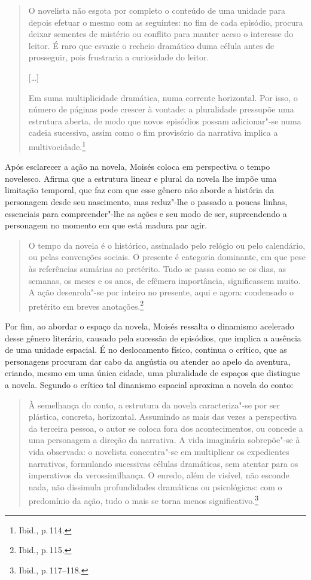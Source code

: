 \begin{quote}
O novelista não esgota por completo o conteúdo de uma unidade para depois efetuar o mesmo com as seguintes: no fim de cada episódio, procura deixar sementes de mistério ou conflito para manter aceso o interesse do leitor. É raro que esvazie o recheio dramático duma célula antes de prosseguir, pois frustraria a curiosidade do leitor.

{[}\ldots{]}

Em suma multiplicidade dramática, numa corrente horizontal. Por isso, o número de páginas pode crescer à vontade: a pluralidade pressupõe uma estrutura aberta, de modo que novos episódios possam adicionar"-se numa cadeia sucessiva, assim como o fim provisório da narrativa implica a multivocidade.\footnote{Ibid., p.\,114.}
\end{quote}

Após esclarecer a ação na novela, Moisés coloca em perspectiva o tempo novelesco. Afirma que a estrutura linear e plural da novela lhe impõe uma limitação temporal, que faz com que esse gênero não aborde a história da personagem desde seu nascimento, mas reduz"-lhe o passado a poucas linhas, essenciais para compreender"-lhe as ações e seu modo de ser, supreendendo a personagem no momento em que está madura par agir.

\begin{quote}
O tempo da novela é o histórico, assinalado pelo relógio ou pelo calendário, ou pelas convenções sociais. O presente é categoria dominante, em que pese às referências sumárias ao pretérito. Tudo se passa como se os dias, as semanas, os meses e os anos, de efêmera importância, significassem muito. A ação desenrola"-se por inteiro no presente, aqui e agora: condensado o pretérito em breves anotações.\footnote{Ibid., p.\,115.}
\end{quote}

Por fim, ao abordar o espaço da novela, Moisés ressalta o dinamismo acelerado desse gênero literário, causado pela sucessão de episódios, que implica a ausência de uma unidade espacial. É no deslocamento físico, continua o crítico, que as personagens procuram dar cabo da angústia ou atender ao apelo da aventura, criando, mesmo em uma única cidade, uma pluralidade de espaços que distingue a novela. Segundo o crítico tal dinanismo espacial aproxima a novela do conto:

\begin{quote}
À semelhança do conto, a estrutura da novela caracteriza"-se por ser plástica, concreta, horizontal. Assumindo as mais das vezes a perspectiva da terceira pessoa, o autor se coloca fora dos acontecimentos, ou concede a uma personagem a direção da narrativa. A vida imaginária sobrepõe"-se à vida observada: o novelista concentra"-se em multiplicar os expedientes narrativos, formulando sucessivas células dramáticas, sem atentar para os imperativos da verossimilhança. O enredo, além de visível, não esconde nada, não dissimula profundidades dramáticas ou psicológicas: com o predomínio da ação, tudo o mais se torna menos significativo.\footnote{Ibid., p.\,117--118.}
\end{quote}

